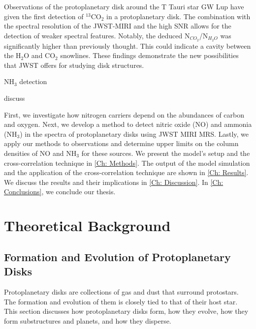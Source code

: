 \documentclass[oneside, single, authoryear, semicolon, 12pt]{lion-msc}
\newcommand{\4}{$_4$}
\newcommand{\3}{$_3$}
\newcommand{\2}{$_2$}
\begin{document}
Observations of the protoplanetary disk around the T Tauri star GW Lup have given the first detection of $^{13}$CO$_2$ in a protoplanetary disk. \cite{Grant_2023} The combination with the spectral resolution of the JWST-MIRI and the high SNR allows for the detection of weaker spectral features. Notably, the deduced N$_{CO_2}$/N$_{H_2O}$ was significantly higher than previously thought. This could indicate a cavity between the H$_2$O and CO$_2$ snowlines. These findings demonstrate the new possibilities that JWST offers for studying disk structures. 

NH\3 detection \cite{Salinas_2016}

discuss \cite{van_Gelder_2024}

First, we investigate how nitrogen carriers depend on the abundances of carbon and oxygen. Next, we develop a method to detect nitric oxide (NO) and ammonia (NH\3) in the spectra of protoplanetary disks using JWST MIRI MRS. Lastly, we apply our methods to observations and determine upper limits on the column densities of NO and NH\3 for these sources. 
We present the model's setup and the cross-correlation technique in \autoref{Ch: Methods}. The output of the model simulation and the application of the cross-correlation technique are shown in \autoref{Ch: Results}. We discuss the results and their implications in \autoref{Ch: Discussion}. In \autoref{Ch: Conclusions}, we conclude our thesis.

\chapter{Theoretical Background}
\section{Formation and Evolution of Protoplanetary Disks}
Protoplanetary disks are collections of gas and dust that surround protostars. The formation and evolution of them is closely tied to that of their host star. This section discusses how protoplanetary disks form, how they evolve, how they form substructures and planets, and how they disperse. 
\end{document}
